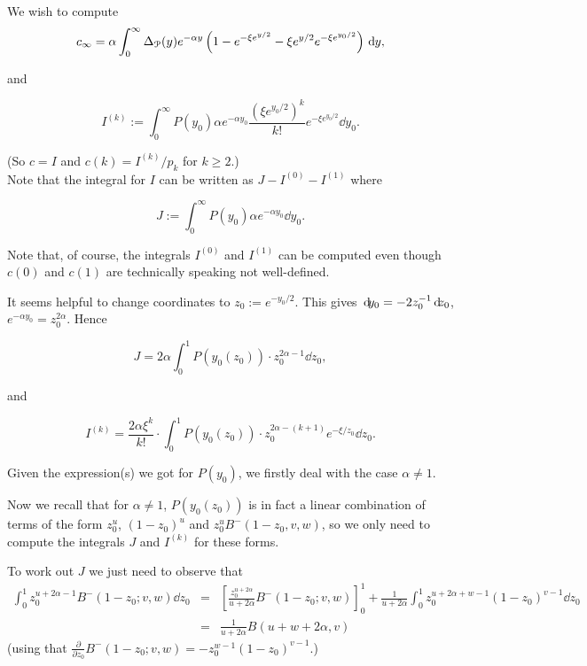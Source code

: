 We wish to compute
\[   
	c_\infty = \alpha \int_0^{\infty} \Delta_{{\mathcal P}}(y) e^{-\alpha y} \left(1-e^{-\xi e^{y/2}} - \xi e^{y/2} 
	e^{-\xi e^{y_0/2}}\right) \operatorname{\, \mathrm{d}\hspace{-2pt}} y, 
\]


\noindent
and

\[ I^{(k)} := 
\int_0^{\infty} P(y_0) \alpha e^{-\alpha y_0} \frac{\left(\xi e^{y_0/2}\right)^k}{k!} e^{-\xi e^{y_0/2}} {\dd} y_0. \]

\noindent
(So $c = I$ and $c(k) = I^{(k)} / p_k $ for $k\geq 2$.) \\
Note that the integral for $I$ can be written as $J - I^{(0)} - I^{(1)}$ where

\[ J := \int_0^{\infty} P(y_0) \alpha e^{-\alpha y_0} {\dd} y_0. \] 

\noindent
Note that, of course, the integrals $I^{(0)}$ and $I^{(1)}$ can be computed even though $c(0)$ and $c(1)$ are technically
speaking not well-defined.



\noindent
It seems helpful to change coordinates to $z_0 := e^{-y_0/2}$.
This gives ${\operatorname{\, \mathrm{d}\hspace{-2pt}}} y_0 = {{\color{black} -}}2 z_0^{-1} {\operatorname{\, \mathrm{d}\hspace{-2pt}}} z_0$, $e^{-\alpha y_0} = z_0^{2\alpha}$.
Hence 

\[ J = 2 \alpha \int_0^1 P(y_0(z_0)) \cdot z_0^{2\alpha-1} {\dd} z_0, \]

\noindent
and 

\[ I^{(k)} = \frac{2 \alpha \xi^k}{k!} \cdot \int_0^1 P(y_0(z_0)) \cdot z_0^{2\alpha-(k+1)} e^{-\xi/z_0} {\dd} z_0. \]

\noindent
Given the expression(s) we got for $P(y_0)$, we firstly deal with the case $\alpha \not = 1$. %


\noindent
Now we recall that for $\alpha \not =1$, $P(y_0(z_0))$ is in fact a linear combination of terms of the form $z_0^u$, $(1-z_0)^u$ and $z_0^u B^-(1-z_0,v,w)$, so we only need to compute the integrals $J$ and $I^{(k)}$ for these forms.

\vspace{1em}

\noindent
To work out $J$ we just need to observe that 
\[ \begin{array}{rcl} 
\int_0^1 z_0^{u+2\alpha-1} B^-(1-z_0;v,w) {\dd} z_0 
& = & 
\left[ \frac{z_0^{u+2\alpha}}{u+2\alpha} B^-(1-z_0;v,w) \right]_0^1 
+ \frac{1}{u+2\alpha} \int_0^1 z_0^{u+2\alpha+w-1} (1-z_0)^{v-1} {\dd} z_0 \\
& = & 
\frac{1}{u+2\alpha} B(u+w+2\alpha,v)
\end{array} \]
\noindent
(using that $\frac{\partial}{\partial z_0} B^-(1-z_0;v,w) = - z_0^{w-1} (1-z_0)^{v-1}$.)

